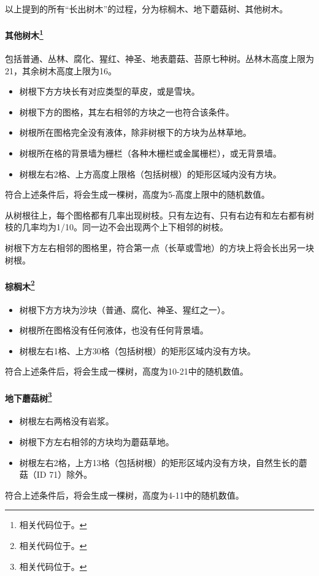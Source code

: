 以上提到的所有“长出树木”的过程，分为棕榈木、地下蘑菇树、其他树木。

\paragraph*{其他树木\footnote{相关代码位于。}}
包括普通、丛林、腐化、猩红、神圣、地表蘑菇、苔原七种树。丛林木高度上限为21，其余树木高度上限为16。

\begin{itemize}
\item 树根下方方块长有对应类型的草皮，或是雪块。
\item 树根下方的图格，其左右相邻的方块之一也符合该条件。
\item 树根所在图格完全没有液体，除非树根下的方块为丛林草地。
\item 树根所在格的背景墙为栅栏（各种木栅栏或金属栅栏），或无背景墙。
\item 树根左右2格、上方高度上限格（包括树根）的矩形区域内没有方块。
\end{itemize}
符合上述条件后，将会生成一棵树，高度为5-高度上限中的随机数值。

从树根往上，每个图格都有几率出现树枝。只有左边有、只有右边有和左右都有树枝的几率均为1/10。同一边不会出现两个上下相邻的树枝。

树根下方左右相邻的图格里，符合第一点（长草或雪地）的方块上将会长出另一块树根。

\paragraph*{棕榈木\footnote{相关代码位于。}}
\begin{itemize}
\item 树根下方方块为沙块（普通、腐化、神圣、猩红之一）。
\item 树根所在图格没有任何液体，也没有任何背景墙。
\item 树根左右1格、上方30格（包括树根）的矩形区域内没有方块。
\end{itemize}
符合上述条件后，将会生成一棵树，高度为10-21中的随机数值。

\paragraph*{地下蘑菇树\footnote{相关代码位于。}}
\begin{itemize}
\item 树根左右两格没有岩浆。
\item 树根下方左右相邻的方块均为蘑菇草地。
\item 树根左右2格，上方13格（包括树根）的矩形区域内没有方块，自然生长的蘑菇（ID 71）除外。
\end{itemize}
符合上述条件后，将会生成一棵树，高度为4-11中的随机数值。

